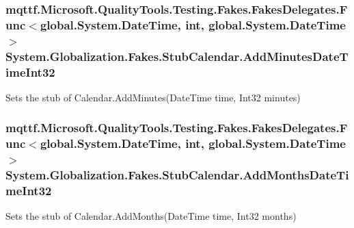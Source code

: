 \hypertarget{class_system_1_1_globalization_1_1_fakes_1_1_stub_calendar_ad79f3c53a87fbc9a67a517bd2af94518}{
\subsubsection[{Add\-Minutes\-Date\-Time\-Int32}]{\setlength{\rightskip}{0pt plus 5cm}mqttf.\-Microsoft.\-Quality\-Tools.\-Testing.\-Fakes.\-Fakes\-Delegates.\-Func$<$global.\-System.\-Date\-Time, int, global.\-System.\-Date\-Time$>$ System.\-Globalization.\-Fakes.\-Stub\-Calendar.\-Add\-Minutes\-Date\-Time\-Int32}}\label{class_system_1_1_globalization_1_1_fakes_1_1_stub_calendar_ad79f3c53a87fbc9a67a517bd2af94518}


Sets the stub of Calendar.\-Add\-Minutes(\-Date\-Time time, Int32 minutes)

\hypertarget{class_system_1_1_globalization_1_1_fakes_1_1_stub_calendar_ac65b46a63336df46bb26e0c6269972f6}{
\subsubsection[{Add\-Months\-Date\-Time\-Int32}]{\setlength{\rightskip}{0pt plus 5cm}mqttf.\-Microsoft.\-Quality\-Tools.\-Testing.\-Fakes.\-Fakes\-Delegates.\-Func$<$global.\-System.\-Date\-Time, int, global.\-System.\-Date\-Time$>$ System.\-Globalization.\-Fakes.\-Stub\-Calendar.\-Add\-Months\-Date\-Time\-Int32}}\label{class_system_1_1_globalization_1_1_fakes_1_1_stub_calendar_ac65b46a63336df46bb26e0c6269972f6}


Sets the stub of Calendar.\-Add\-Months(\-Date\-Time time, Int32 months)

